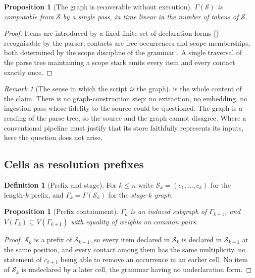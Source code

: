 \documentclass[twocolumn,11pt,a4paper]{article}
\theoremstyle{sup}
\newtheorem{proposition}[theorem]{Proposition}
\theoremstyle{definition}
\newtheorem{definition}[theorem]{Definition}
\theoremstyle{remark}
\newtheorem{remark}[theorem]{Remark}
\newcommand{\Gph}{\Gamma}
\newcommand{\V}{V}
\newcommand{\Src}{\mathcal{S}}
\begin{document}
\begin{proposition}[The graph is recoverable without execution]
\label{prop:static}
$\Gph(\Src)$ is computable from $\Src$ by a single pass, in time linear in the
number of tokens of $\Src$.
\end{proposition}

\begin{proof}
Items are introduced by a fixed finite set of declaration forms
() recognisable by the parser; contacts are free occurrences and
scope memberships, both determined by the scope discipline of the grammar
\citep{sachikonye2025grammar}. A single traversal of the parse tree maintaining
a scope stack emits every item and every contact exactly once.
\end{proof}

\begin{remark}[The sense in which the script \emph{is} the graph]
\label{rem:is-not-describes}
 is the whole content of the claim. There is no
graph-construction step: no extraction, no embedding, no ingestion pass whose
fidelity to the source could be questioned. The graph is a reading of the parse
tree, so the source and the graph cannot disagree. Where a conventional
pipeline must justify that its store faithfully represents its inputs, here the
question does not arise.
\end{remark}

\subsection{Cells as resolution prefixes}

\begin{definition}[Prefix and stage]
\label{def:prefix}
For $k\le n$ write $\Src_k=(c_1,\dots,c_k)$ for the length-$k$ prefix, and
$\Gph_k=\Gph(\Src_k)$ for the \emph{stage-$k$ graph}.
\end{definition}

\begin{proposition}[Prefix containment]
\label{prop:containment}
$\Gph_k$ is an induced subgraph of $\Gph_{k+1}$, and $\V(\Gph_k)\subseteq
\V(\Gph_{k+1})$ with equality of weights on common pairs.
\end{proposition}

\begin{proof}
$\Src_k$ is a prefix of $\Src_{k+1}$, so every item declared in $\Src_k$ is
declared in $\Src_{k+1}$ at the same position, and every contact among them has
the same multiplicity, no statement of $c_{k+1}$ being able to remove an
occurrence in an earlier cell. No item of $\Src_k$ is undeclared by a later
cell, the grammar having no undeclaration form.
\end{proof}
\end{document}
